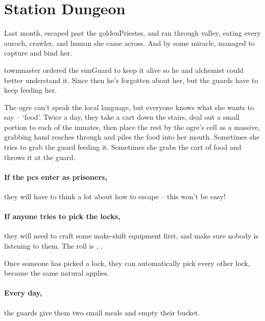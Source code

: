 \prisonMap

\section{Station Dungeon}
\label{stationDungeon}

\begin{multicols}{2}

\begin{exampletext}
  \noindent
  Last month,  escaped past the \glspl{goldenPriests}, and ran through \gls{valley}, eating every auroch, \gls{crawler}, and human she came across.
  And by some miracle,  managed to capture and bind her.

  \Gls{townmaster} ordered the \gls{sunGuard} to keep it alive so he and \gls{alchemist} could better understand it.
  Since then he's forgotten about her, but the guards have to keep feeding her.

  The \gls{ogre} can't speak the local language, but everyone knows what she wants to say -- `food'.
  Twice a day, they take a cart down the stairs, deal out a small portion to each of the inmates, then place the rest by the ogre's cell as a massive, grabbing hand reaches through and piles the food into her mouth.
  Sometimes she tries to grab the guard feeding it.
  Sometimes she grabs the cart of food and throws it at the guard.
\end{exampletext}

\paragraph{If the \glspl{pc} enter as prisoners,}
they will have to think a lot about how to escape -- this won't be easy!

\paragraph{If anyone tries to pick the locks,}
they will need to craft some make-shift equipment first, and make sure nobody is listening to them.
The roll is , \tn[12].

Once someone has picked a lock, they can automatically pick every other lock, because the same \gls{natural} applies.

\paragraph{Every day,}
the guards give them two small meals and empty their bucket.


\end{multicols}
